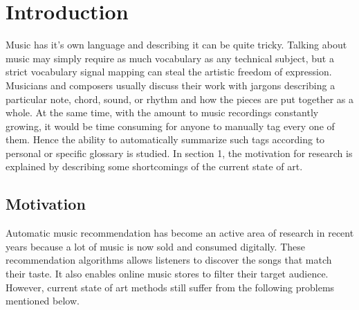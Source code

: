 

\chapter{Introduction} %

\label{Chapter1} %


\newcommand{\keyword}[1]{\textbf{#1}}
\newcommand{\tabhead}[1]{\textbf{#1}}
\newcommand{\code}[1]{\texttt{#1}}
\newcommand{\file}[1]{\texttt{\bfseries#1}}
\newcommand{\option}[1]{\texttt{\itshape#1}}


Music has it’s own language and describing it can be quite tricky. Talking about music may simply require as much vocabulary as any technical subject, but a strict vocabulary signal mapping can steal the artistic freedom of expression. Musicians and composers usually discuss their work with jargons describing a particular note, chord, sound, or rhythm and how the pieces are put together as a whole. At the same time, with the amount to music recordings constantly growing, it would be time consuming for anyone to manually tag every one of them. Hence the ability to automatically summarize such tags according to personal or specific glossary is studied.  In section 1, the motivation for research is explained by describing some shortcomings of the current state of art.  




\section{Motivation}
Automatic music recommendation has become an active area of research in recent years because a lot of music is now sold and consumed digitally. These recommendation algorithms allows listeners to discover the songs that match their taste.  It also enables online music stores to filter their target audience. However, current state of art methods still suffer from the following problems mentioned below.


